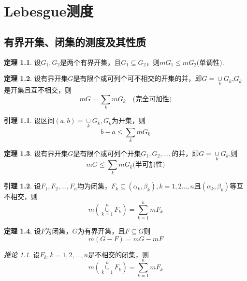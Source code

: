 \documentclass[oneside]{ctexbook}
\theoremstyle{definition} \newtheorem{defi}{定义}[section]
\theoremstyle{definition} \newtheorem{law}{定理}[section]
\theoremstyle{definition} \newtheorem{jury}{引理}[section]
\theoremstyle{remark} \newtheorem*{mar}{\heiti 推论}
\begin{document}
    \chapter{Lebesgue测度}
    \section{有界开集、闭集的测度及其性质}
\begin{law}
    设$G_{1},G_{2}$是两个有界开集，且$G_{1}\subseteq G_{2}$，则$mG_{1}\leq mG_{2}$(单调性).
\end{law}
\begin{law}
	设有界开集$G$是有限个或可列个可不相交的开集的并，即$G=\underset{k}\cup G_{k}$,$G_{k}$是开集且互不相交，则\[mG=\sum\limits_{k}mG_{k}\quad\text{(完全可加性)}\]
\end{law}
\begin{jury}
	设区间$(a,b)=\underset{k}\cup G_{k},G_{k}$为开集，则\[b-a\leq \sum_{k}mG_{k}\]
\end{jury}
\begin{law}
	设有界开集$G$是有限个或可列个开集$G_{1},G_{2},\dots,$的并，即$G=\underset{k}\cup G_{k}$,则\[mG\leq\sum_{k}mG_{k}\text{(半可加性)}\]
\end{law}
\begin{jury}
	设$F_{1},F_{2},\dots,F_{n}$均为闭集，$F_{k}\subseteq(\alpha_{k},\beta_{k}),k=1,2\dots,n$且$(\alpha_{k},\beta_{k})$等互不相交，则\[m(\overset{n}{\underset{k=1}\cup}F_{k})=\sum_{k=1}^{n}mF_{k}\]
\end{jury}
\begin{law}
	设$F$为闭集，$G$为有界开集，且$F\subseteq G$则\[m(G-F)=mG-mF\]
\end{law}
\begin{mar}
	设$F_{k},k=1,2,\dots,n$是不相交的闭集，则\[m(\underset{k=1}{\overset{n}\cup }F_{k})=\sum_{k=1}^{n}mF_{k}\]
\end{mar}
\end{document}
